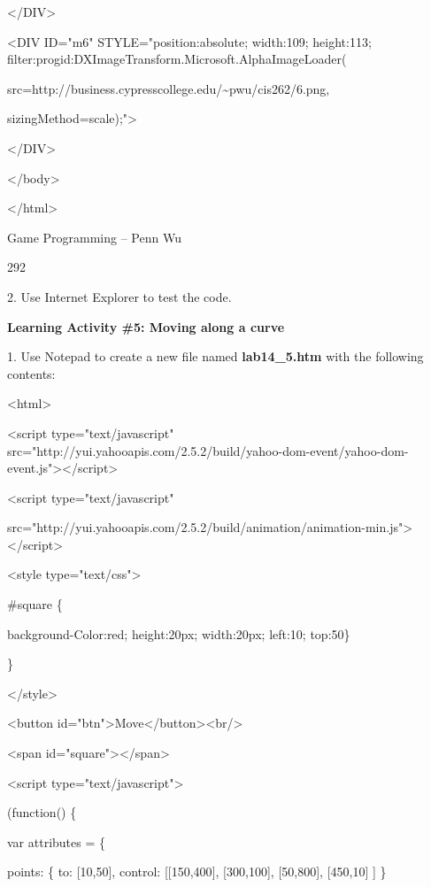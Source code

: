 \documentclass[
]{article}
\begin{document}
\textless/DIV\textgreater{}

\textless DIV ID="m6" STYLE="position:absolute; width:109; height:113;
filter:progid:DXImageTransform.Microsoft.AlphaImageLoader(

src=\textquotesingle http://business.cypresscollege.edu/\textasciitilde pwu/cis262/6.png\textquotesingle,

sizingMethod=\textquotesingle scale\textquotesingle);"\textgreater{}

\textless/DIV\textgreater{}

\textless/body\textgreater{}

\textless/html\textgreater{}

Game Programming -- Penn Wu

292

\protect\hypertarget{index_split_015.htmlux5cux23p293}{}{}2. Use
Internet Explorer to test the code.

\textbf{Learning Activity \#5: Moving along a curve}

1. Use Notepad to create a new file named \textbf{lab14\_5.htm} with the
following contents:

\textless html\textgreater{}

\textless script type="text/javascript"
src="http://yui.yahooapis.com/2.5.2/build/yahoo-dom-event/yahoo-dom-event.js"\textgreater\textless/script\textgreater{}

\textless script type="text/javascript"

src="http://yui.yahooapis.com/2.5.2/build/animation/animation-min.js"\textgreater\textless/script\textgreater{}

\textless style type="text/css"\textgreater{}

\#square \{

background-Color:red; height:20px; width:20px; left:10; top:50\}

\}

\textless/style\textgreater{}

\textless button
id="btn"\textgreater Move\textless/button\textgreater\textless br/\textgreater{}

\textless span id="square"\textgreater\textless/span\textgreater{}

\textless script type="text/javascript"\textgreater{}

(function() \{

var attributes = \{

points: \{ to: {[}10,50{]}, control: {[}{[}150,400{]}, {[}300,100{]},
{[}50,800{]}, {[}450,10{]} {]} \}
\end{document}
